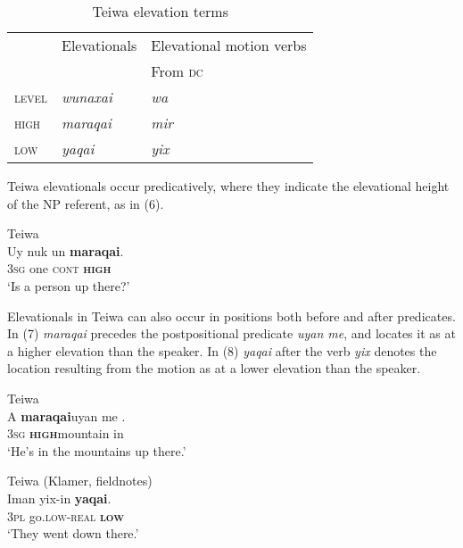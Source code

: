 \begin{table}\centering


\begin{tabular}{lll}
 & Elevationals & Elevational motion verbs\\
&  & From \textsc{dc}\\
{\scshape level} & {\itshape wunaxai} & {\itshape wa}\\
{\scshape high} & {\itshape maraqai} & {\itshape mir}\\
{\scshape low} & {\itshape yaqai} & {\itshape yix}\\
\end{tabular}

\caption{Teiwa elevation terms}
\end{table}

Teiwa elevationals occur predicatively, where they indicate the elevational height of the NP referent, as in (6).



\ea%
\label{ex:6}
 Teiwa \citep[142]{Klamer2010}\\
\gll  Uy  nuk   un  \textbf{{maraqai}}{.} \\
       \textsc{3sg} one  \textsc{cont} \textbf{\textsc{high}} \\
\glt `Is a person up there?'
\z







Elevationals in Teiwa can also occur in positions both before and after predicates. In (7) \textit{maraqai} precedes the postpositional predicate \textit{uyan me{\textglotstop}}, and locates it as at a higher elevation than the speaker. In (8) \textit{yaqai} after the verb \textit{yix} denotes the location resulting from the motion as at a lower elevation than the speaker.



\ea%
\label{ex:7}
  Teiwa \citep[141]{Klamer2010}\\
\gll A  \textbf{{maraqai}}{uyan}  me {{\textglotstop}}{.} \\
      \textsc{3sg} \textbf{\textsc{high}}mountain  in    \\
\glt `He's in the mountains up there.'
\z









\ea%
\label{ex:8}
  Teiwa (Klamer, fieldnotes)\\
\gll Iman     {yix-in} \textbf{{yaqai}}{.} \\
       \textsc{3pl} go.\textsc{low}{}-\textsc{real} \textbf{\textsc{low}} \\
\glt  `They went down there.'
\z







